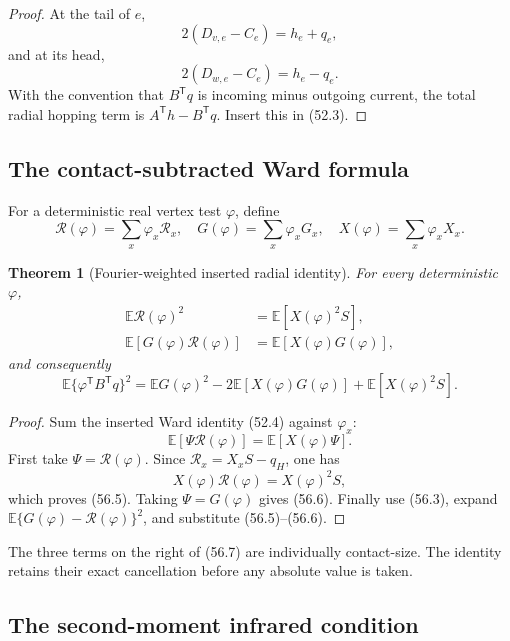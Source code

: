 \documentclass[11pt]{article}
\newtheorem{theorem}{Theorem}[section]
\theoremstyle{remark}
\begin{document}
\begin{proof}
At the tail of \(e\),
\[
 2(D_{v,e}-C_e)=h_e+q_e,
\]
and at its head,
\[
 2(D_{w,e}-C_e)=h_e-q_e.
\]
With the convention that \(B^{\mathsf T}q\) is incoming minus
outgoing current, the total radial hopping term is
\(A^{\mathsf T}h-B^{\mathsf T}q\).  Insert this in (52.3).
\end{proof}

\subsection{The contact-subtracted Ward formula}

For a deterministic real vertex test \(\varphi\), define
\[
 \mathscr R(\varphi)=\sum_x\varphi_x\mathscr R_x,\quad
 G(\varphi)=\sum_x\varphi_xG_x,\quad
 X(\varphi)=\sum_x\varphi_xX_x.                  \tag{56.4}
\]

\begin{theorem}[Fourier-weighted inserted radial identity]
\label{thm:v17v56-contact}
For every deterministic \(\varphi\),
\[
\begin{aligned}
 \mathbb E\mathscr R(\varphi)^2
 &=\mathbb E[X(\varphi)^2S],                      \tag{56.5}\\
 \mathbb E[G(\varphi)\mathscr R(\varphi)]
 &=\mathbb E[X(\varphi)G(\varphi)],               \tag{56.6}
\end{aligned}
\]
and consequently
\[
\boxed{
 \mathbb E\{\varphi^{\mathsf T}B^{\mathsf T}q\}^2
 =
 \mathbb E G(\varphi)^2
 -2\mathbb E[X(\varphi)G(\varphi)]
 +\mathbb E[X(\varphi)^2S].}                     \tag{56.7}
\]
\end{theorem}

\begin{proof}
Sum the inserted Ward identity (52.4) against \(\varphi_x\):
\[
 \mathbb E[\Psi\mathscr R(\varphi)]
 =\mathbb E[X(\varphi)\Psi].                     \tag{56.8}
\]
First take \(\Psi=\mathscr R(\varphi)\).  Since
\(\mathscr R_x=X_xS-q_H\), one has
\[
 X(\varphi)\mathscr R(\varphi)=X(\varphi)^2S,
\]
which proves (56.5).  Taking \(\Psi=G(\varphi)\) gives (56.6).
Finally use (56.3), expand
\(\mathbb E\{G(\varphi)-\mathscr R(\varphi)\}^2\),
and substitute (56.5)--(56.6).
\end{proof}

The three terms on the right of (56.7) are individually contact-size.
The identity retains their exact cancellation before any absolute
value is taken.

\subsection{The second-moment infrared condition}
\end{document}
